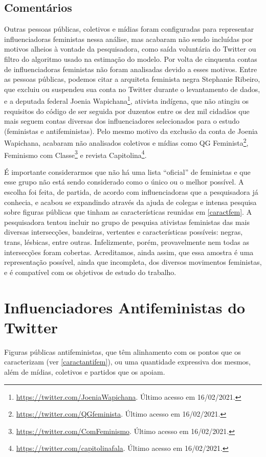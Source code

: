 \documentclass[
	12pt,				%
	openright,			%
	twoside,			%
	a4paper,			%
	english,			%
	brazil				%
	]{abntex2}
\begin{document}
\begin{anexosenv}
 \subsection*{Comentários}
 Outras pessoas públicas, coletivos e mídias foram configuradas para representar influenciadoras feministas nessa análise, mas acabaram não sendo incluídas por motivos alheios à vontade da pesquisadora, como saída voluntária do Twitter ou filtro do algoritmo usado na estimação do modelo. Por volta de cinquenta contas de influenciadoras feministas não foram analisadas devido a esses motivos. Entre as pessoas públicas, podemos citar a arquiteta feminista negra Stephanie Ribeiro, que excluiu ou suspendeu sua conta no Twitter durante o levantamento de dados, e a deputada federal Joenia Wapichana\footnote{\url{https://twitter.com/JoeniaWapichana}. Último acesso em 16/02/2021.}, ativista indígena, que não atingiu os requisitos do código de ser seguida por duzentos entre os dez mil cidadãos que mais seguem contas diversas dos influenciadores selecionados para o estudo (feministas e antifeministas). Pelo mesmo motivo da exclusão da conta de Joenia Wapichana, acabaram não analisados coletivos e mídias como QG Feminista\footnote{\url{https://twitter.com/QGfeminista}. Último acesso em 16/02/2021.}, Feminismo com Classe\footnote{\url{https://twitter.com/ComFeminismo}. Último acesso em 16/02/2021.} e revista Capitolina\footnote{\url{https://twitter.com/capitolinafala}. Último acesso em 16/02/2021.}.
 
 É importante considerarmos que não há uma lista ``oficial'' de feministas e que esse grupo não está sendo considerado como o único ou o melhor possível. A escolha foi feita, de partida, de acordo com influenciadoras que a pesquisadora já conhecia, e acabou se expandindo através da ajuda de colegas e intensa pesquisa sobre figuras públicas que tinham as características reunidas em \ref{caractfem}. A pesquisadora tentou incluir no grupo de pesquisa ativistas feministas das mais diversas intersecções, bandeiras, vertentes e características possíveis: negras, trans, lésbicas, entre outras. Infelizmente, porém, provavelmente nem todas as intersecções foram cobertas. Acreditamos, ainda assim, que essa amostra é uma representação possível, ainda que incompleta, dos diversos movimentos feministas, e é compatível com os objetivos de estudo do trabalho.
 
 \newpage
 
 \section*{Influenciadores Antifeministas do Twitter}
 Figuras públicas antifeministas, que têm alinhamento com os pontos que os caracterizam (ver \ref{caractantifem}), ou uma quantidade expressiva dos mesmos, além de mídias, coletivos e partidos que os apoiam.
 

\end{anexosenv}
\end{document}
